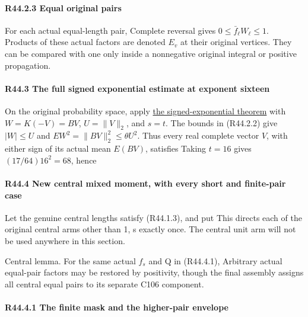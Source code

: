 \paragraph{R44.2.3 Equal original pairs}

For each actual equal-length pair,
Complete reversal gives \(0\le \bar f_\ell W_\ell\le 1.\) Products of these actual
factors are denoted \(E_v\) at their original vertices. They can be compared
with one only inside a nonnegative original integral or positive
propagation. 

\paragraph{R44.3 The full signed exponential estimate at exponent sixteen}

On the original probability space, apply
\hyperref[part:Q81.2]{the signed-exponential theorem} with
\(W=K(-V)=BV\), \(U=\|V\|_2\), and \(s=t\).
The bounds in (R44.2.2) give \(|W|\le U\) and
\(EW^2=\|BV\|_2^2\le\theta U^2\).
Thus every real complete vector \(V\), with either sign of its actual
mean \(E(BV)\), satisfies
Taking \(t=16\) gives \((17/64)16^2=68\), hence

\paragraph{R44.4 New central mixed moment, with every short and finite-pair case}\label{part:R44.4}

Let the genuine central lengths satisfy (R44.1.3), and put
This directs each of the original central arms other than 1, s
exactly once. The central unit arm will not be used anywhere in this
section.

Central lemma. For the same actual \(f_s\) and Q in (R44.4.1),
Arbitrary actual equal-pair factors may be restored by positivity,
though the final assembly assigns all central equal pairs to its
separate C106 component.

\paragraph{R44.4.1 The finite mask and the higher-pair envelope}

